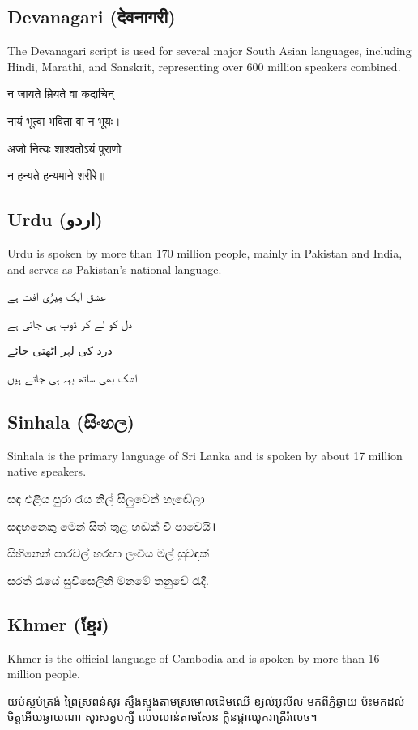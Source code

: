 \documentclass{article}
\begin{document}
\subsection{Devanagari (देवनागरी)}\label{devanagari}

The Devanagari script is used for several major South Asian languages, including Hindi, Marathi, and Sanskrit, representing over 600 million speakers combined.

न जायते म्रियते वा कदाचिन्

नायं भूत्वा भविता वा न भूयः।

अजो नित्यः शाश्वतोऽयं पुराणो

न हन्यते हन्यमाने शरीरे॥

\subsection{Urdu (اردو)}\label{urdu}

Urdu is spoken by more than 170 million people, mainly in Pakistan and India, and serves as Pakistan's national language.

عشق ایک مِیرُی آفت ہے

دل کو لے کر ڈوب ہی جاتی ہے

درد کی لہر اٹھتی جائے

اشک بھی ساتھ بہہ ہی جاتے ہیں

\subsection{Sinhala (සිංහල)}\label{sinhala}

Sinhala is the primary language of Sri Lanka and is spoken by about 17 million native speakers.

සඳ එළිය පුරා රැය නිල් සිලුවෙන් හැඬේලා

සඳහනෙකු මෙන් සිත් තුළ හඬක් වී පාවෙයි।

සිහිනෙන් පාරවල් හරහා ලංවීය මල් සුවඳක්

සරත් රැයේ සුවිසෙලිනි මනමේ තනුවේ රැදී.

\subsection{Khmer (ខ្មែរ)}\label{khmer}

Khmer is the official language of Cambodia and is spoken by more than 16 million people.

យប់ស្ថប់ត្រង់ ព្រៃស្រពន់សូរ ស្ទឹងស្ទូងតាមស្រមោលដើមឈើ ខ្យល់អូលីល មកពីភ្នំឆ្ងាយ ប៉ះមកដល់ចិត្តអើយឆ្ងាយណា សូរសត្វបក្សី លេបលាន់តាមសែន ក្លិនផ្កាឈូករាត្រីរំលេច។
\end{document}
